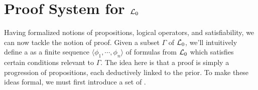 \documentclass{article}
\begin{document}
\section{Proof System for $ \mathcal{L}_0 $}
Having formalized notions of propositions, logical operators, and satisfiability, we can now tackle the notion of proof. Given a subset $ \Gamma $ of $ \mathcal{L}_0 $, we'll intuitively define a  as a finite sequence $ \langle \phi_1, \cdots, \phi_n \rangle $ of formulas from $ \mathcal{L}_0 $ which satisfies certain conditions relevant to $ \Gamma $. The idea here is that a proof is simply a progression of propositions, each deductively linked to the prior. To make these ideas formal, we must first introduce a set of .
\end{document}
